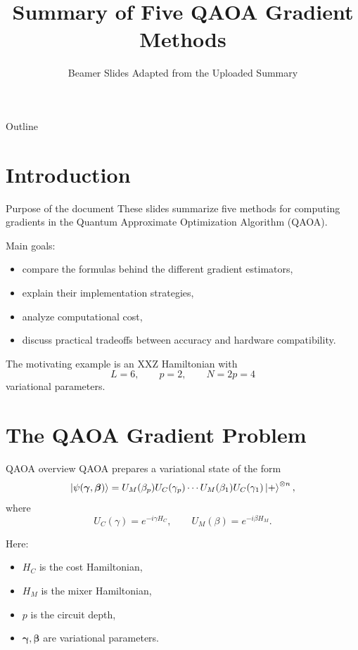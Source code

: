 \documentclass[aspectratio=169]{beamer}
\title{Summary of Five QAOA Gradient Methods}
\subtitle{Beamer Slides Adapted from the Uploaded Summary}
\author{}
\date{}
\begin{document}
\frame{\titlepage}

\begin{frame}{Outline}
\tableofcontents
\end{frame}

\section{Introduction}

\begin{frame}{Purpose of the document}
These slides summarize five methods for computing gradients in the
Quantum Approximate Optimization Algorithm (QAOA).

\medskip

Main goals:
\begin{itemize}
\item compare the formulas behind the different gradient estimators,
\item explain their implementation strategies,
\item analyze computational cost,
\item discuss practical tradeoffs between accuracy and hardware compatibility.
\end{itemize}

The motivating example is an XXZ Hamiltonian with
\[
L=6,\qquad p=2,\qquad N=2p=4
\]
variational parameters.
\end{frame}

\section{The QAOA Gradient Problem}

\begin{frame}{QAOA overview}
QAOA prepares a variational state of the form
\[
\ket{\psi(\bm{\gamma},\bm{\beta})}
=
U_M(\beta_p)U_C(\gamma_p)\cdots U_M(\beta_1)U_C(\gamma_1)\ket{+}^{\otimes n},
\]
where
\[
U_C(\gamma)=e^{-i\gamma H_C},
\qquad
U_M(\beta)=e^{-i\beta H_M}.
\]

Here:
\begin{itemize}
\item \(H_C\) is the cost Hamiltonian,
\item \(H_M\) is the mixer Hamiltonian,
\item \(p\) is the circuit depth,
\item \(\bm{\gamma},\bm{\beta}\) are variational parameters.
\end{itemize}
\end{frame}
\end{document}
